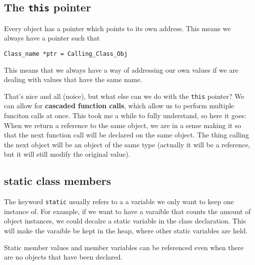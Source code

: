 \documentclass{article}
\begin{document}
\subsection{The \texttt{this} pointer}
Every object has a pointer which points to its own address. This means we always have a pointer such that
\begin{verbatim}
Class_name *ptr = Calling_Class_Obj
\end{verbatim}
This means that we always have a way of addressing our own values if we are dealing with values that have the
same name.

That's nice and all (noice), but what else can we do with the \texttt{this} pointer? We can allow for
\textbf{cascaded function calls}, which allow us to perform multiple funciton calls at once.
This took me a while to fully understand, so here it goes: When we return a reference to the same object, 
we are in a sense making it so that the next function call will be declared on the same object. The thing
calling the next object will be an object of the same type (actually it will be a reference, but it will 
still modify the original value).
\subsection{static class members}
The keyword \texttt{static} usually refers to a a variable we only want to keep one instance of. For example,
if we want to have a varaible that counts the amount of object instances, we could decalre a static variable 
in the class declaration. This will make the varaible be kept in the heap, where other static variables are held.

Static member values and member variables can be referenced even when there are no objects that have
been declared.
\end{document}

